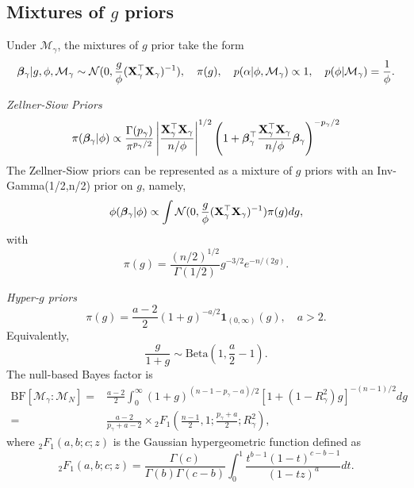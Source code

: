 \documentclass[11pt]{article}
\newcommand{\bfsym}[1]{\ensuremath{\boldsymbol{#1}}}
\def\bbeta{\bfsym \beta}
\theoremstyle{plain}
\theoremstyle{definition}
\theoremstyle{remark}
\begin{document}
\subsection{Mixtures of $g$ priors}
Under $\mathcal M_\gamma$, the mixtures of $g$ prior take the form
\begin{equation*}
    \bbeta_{\gamma}|g, \phi,\mathcal M_\gamma \sim \mathcal N (0,\frac{g}{\phi} (\BX_{\gamma}^\top \BX_{\gamma})^{-1}),
    \quad \pi(g),
    \quad p(\alpha|\phi,\mathcal M_\gamma)\propto 1,
    \quad p(\phi|\mathcal M_\gamma) = \frac{1}{\phi}.
\end{equation*}

\emph{Zellner-Siow Priors}
\begin{equation*}
    \pi(\bbeta_\gamma | \phi)
    \propto
    \frac{\Gamma(p_{\gamma})}{\pi^{p_\gamma/2}}
    \left|
    \frac{\BX_\gamma^\top \BX_\gamma}{n/\phi}
    \right|^{1/2}
    \left(
        1+\bbeta_\gamma^\top \frac{\BX_\gamma^\top \BX_\gamma}{n/\phi}   \bbeta_\gamma
    \right)^{-p_\gamma/2}
\end{equation*}
The Zellner-Siow priors can be represented as a mixture of $g$ priors with an Inv-Gamma(1/2,n/2) prior on $g$, namely,
\begin{equation*}
    \phi(\bbeta_\gamma|\phi)
    \propto
    \int \mathcal N (0,\frac{g}{\phi} (\BX_{\gamma}^\top \BX_{\gamma})^{-1}) \pi(g) dg,
\end{equation*}
with
\begin{equation*}
    \pi(g)=\frac{(n/2)^{1/2}}{\Gamma(1/2)} g^{-3/2} e^{-n/(2g)}.
\end{equation*}

\emph{Hyper-$g$ priors}
\begin{equation*}
    \pi(g)=\frac{a-2}{2} (1+g)^{-a/2}\mathbf{1}_{(0,\infty)}(g),\quad a>2.
\end{equation*}
Equivalently,
\begin{equation*}
    \frac{g}{1+g} \sim \text{Beta} (1,\frac{a}{2}-1).
\end{equation*}
The null-based Bayes factor is
\begin{equation*}
    \begin{split}
    \text{BF}[\mathcal M_\gamma : \mathcal M_N]=
&
\frac{a-2}{2}\int_{0}^\infty (1+g)^{(n-1-p_\gamma -a)/2} [1+(1-R^2_\gamma)g]^{-(n-1)/2} dg
\\
=&
\frac{a-2}{p_\gamma + a-2}
\times
{}_2 F_1
\left(
    \frac{n-1}{2}, 1;
    \frac{p_\gamma+a}{2};
    R^2_\gamma
\right),
\end{split}
\end{equation*}
where ${}_2 F_1 (a,b;c;z)$ is the Gaussian hypergeometric function defined as
\begin{equation*}
    {}_2 F_1 (a,b;c;z)
    =\frac{\Gamma(c)}{\Gamma(b) \Gamma(c-b)}
    \int_0^1
    \frac{t^{b-1}(1-t)^{c-b-1}}{(1-tz)^a}
    dt.
\end{equation*}
\end{document}
